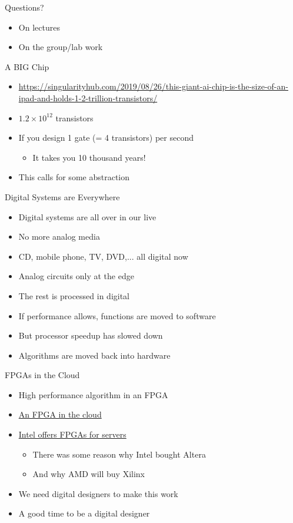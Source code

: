 \begin{frame}[fragile]{Questions?}
\begin{itemize}
\item On lectures
\item On the group/lab work
\end{itemize}
\end{frame}


\begin{frame}[fragile]{A BIG Chip}
\begin{itemize}
\item \url{https://singularityhub.com/2019/08/26/this-giant-ai-chip-is-the-size-of-an-ipad-and-holds-1-2-trillion-transistors/}
\item $1.2 \times 10^{12}$ transistors
\item If you design 1 gate (= 4 transistors) per second
\begin{itemize}
\item It takes you 10 thousand years!
\end{itemize}
\item This calls for some abstraction
\end{itemize}
\end{frame}

\begin{frame}[fragile]{Digital Systems are Everywhere}
\begin{itemize}
\item Digital systems are all over in our live
\item No more analog media
\item CD, mobile phone, TV, DVD,... all digital now
\item Analog circuits only at the edge
\item The rest is processed in digital
\item If performance allows, functions are moved to software
\item But processor speedup has slowed down
\item Algorithms are moved back into hardware
\end{itemize}
\end{frame}

\begin{frame}[fragile]{FPGAs in the Cloud}
\begin{itemize}
\item High performance algorithm in an FPGA
\item \href{https://aws.amazon.com/ec2/instance-types/f1/}{An FPGA in the cloud}
\item \href{https://www.intel.com/content/www/us/en/products/docs/storage/programmable/applications/cloud.html}{Intel offers FPGAs for servers}
\begin{itemize}
\item There was some reason why Intel bought Altera
\item And why AMD will buy Xilinx
\end{itemize}
\item We need digital designers to make this work
\item A good time to be a digital designer
\end{itemize}
\end{frame}

